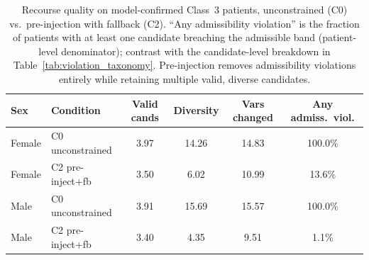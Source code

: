 \begin{table}[ht]
\centering
\caption{Recourse quality on model-confirmed Class~3 patients, unconstrained
(C0) vs.\ pre-injection with fallback (C2). ``Any admissibility violation'' is
the fraction of patients with at least one candidate breaching the admissible
band (patient-level denominator); contrast with the candidate-level breakdown
in Table~\ref{tab:violation_taxonomy}. Pre-injection removes admissibility
violations entirely while retaining multiple valid, diverse candidates.}
\label{tab:quality_revised}
\begin{tabular}{llcccc}
\toprule
Sex & Condition & Valid cands & Diversity & Vars changed & Any admiss.\ viol. \\
\midrule
  Female & C0 unconstrained & 3.97 & 14.26 & 14.83 & 100.0\% \\
  Female & C2 pre-inject+fb & 3.50 & 6.02 & 10.99 & 13.6\% \\
  Male & C0 unconstrained & 3.91 & 15.69 & 15.57 & 100.0\% \\
  Male & C2 pre-inject+fb & 3.40 & 4.35 & 9.51 & 1.1\% \\
\bottomrule
\end{tabular}
\end{table}
